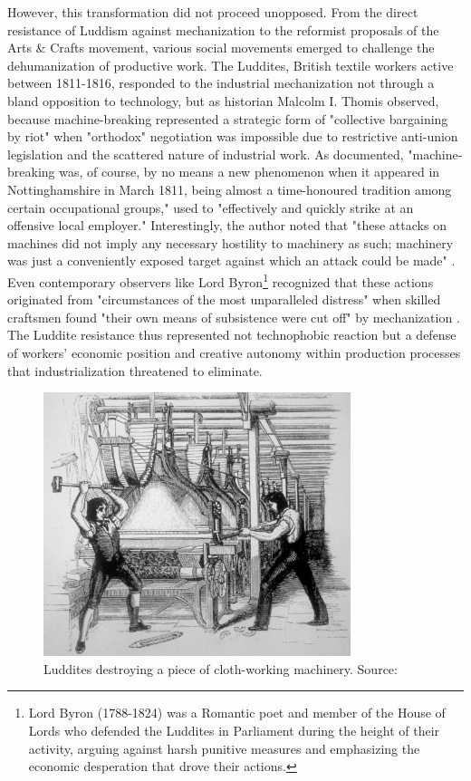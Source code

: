 However, this transformation did not proceed unopposed. From the direct resistance of Luddism against mechanization to the reformist proposals of the Arts \& Crafts movement, various social movements emerged to challenge the dehumanization of productive work. The Luddites, British textile workers active between 1811-1816, responded to the industrial mechanization not through a bland opposition to technology, but as historian Malcolm I. Thomis observed, because machine-breaking represented a strategic form of "collective bargaining by riot" \citep{thomis1993} when "orthodox" negotiation was impossible due to restrictive anti-union legislation and the scattered nature of industrial work. As \citet{thomis1993} documented, "machine-breaking was, of course, by no means a new phenomenon when it appeared in Nottinghamshire in March 1811, being almost a time-honoured tradition among certain occupational groups," used to "effectively and quickly strike at an offensive local employer." Interestingly, the author noted that "these attacks on machines did not imply any necessary hostility to machinery as such; machinery was just a conveniently exposed target against which an attack could be made" \citep{thomis1993}. Even contemporary observers like Lord Byron\footnote{Lord Byron (1788-1824) was a Romantic poet and member of the House of Lords who defended the Luddites in Parliament during the height of their activity, arguing against harsh punitive measures and emphasizing the economic desperation that drove their actions.} recognized that these actions originated from "circumstances of the most unparalleled distress" when skilled craftsmen found "their own means of subsistence were cut off" by mechanization \citep{byron1816}. The Luddite resistance thus represented not technophobic reaction but a defense of workers' economic position and creative autonomy within production processes that industrialization threatened to eliminate.

\begin{figure}[H]
\centering
\includegraphics[width=0.8\textwidth]{figures/chapter1/Luddites.jpg}
\caption{Luddites destroying a piece of cloth-working machinery. Source: \citet{perrigo2023}}
\label{fig:luddites_machinery}
\end{figure}

